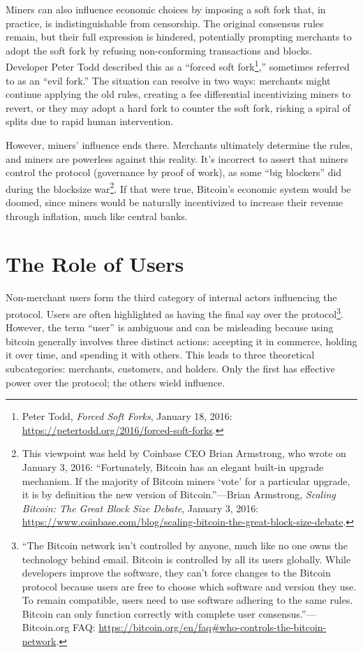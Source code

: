 \documentclass[
  a5paper,
  smalldemyvopaper,10pt,twoside,onecolumn,openright,extrafontsizes,hidelinks]{memoir}
\begin{document}
Miners can also influence economic choices by imposing a soft fork that,
in practice, is indistinguishable from censorship. The original
consensus rules remain, but their full expression is hindered,
potentially prompting merchants to adopt the soft fork by refusing
non-conforming transactions and blocks. Developer Peter Todd described
this as a ``forced soft fork\footnote{Peter Todd, \emph{Forced Soft
  Forks}, January 18, 2016:
  \url{https://petertodd.org/2016/forced-soft-forks}.},'' sometimes
referred to as an ``evil fork.'' The situation can resolve in two ways:
merchants might continue applying the old rules, creating a fee
differential incentivizing miners to revert, or they may adopt a hard
fork to counter the soft fork, risking a spiral of splits due to rapid
human intervention.

However, miners' influence ends there. Merchants ultimately determine
the rules, and miners are powerless against this reality. It's incorrect
to assert that miners control the protocol (governance by proof of
work), as some ``big blockers'' did during the blocksize war\footnote{This
  viewpoint was held by Coinbase CEO Brian Armstrong, who wrote on
  January 3, 2016: ``Fortunately, Bitcoin has an elegant built-in
  upgrade mechanism. If the majority of Bitcoin miners `vote' for a
  particular upgrade, it is by definition the new version of
  Bitcoin.''---Brian Armstrong, \emph{Scaling Bitcoin: The Great Block
  Size Debate}, January 3, 2016:
  \url{https://www.coinbase.com/blog/scaling-bitcoin-the-great-block-size-debate}.}.
If that were true, Bitcoin's economic system would be doomed, since
miners would be naturally incentivized to increase their revenue through
inflation, much like central banks.

\section*{The Role of Users}\label{the-role-of-users}


Non-merchant users form the third category of internal actors
influencing the protocol. Users are often highlighted as having the
final say over the protocol\footnote{``The Bitcoin network isn't
  controlled by anyone, much like no one owns the technology behind
  email. Bitcoin is controlled by all its users globally. While
  developers improve the software, they can't force changes to the
  Bitcoin protocol because users are free to choose which software and
  version they use. To remain compatible, users need to use software
  adhering to the same rules. Bitcoin can only function correctly with
  complete user consensus.''---Bitcoin.org FAQ:
  \url{https://bitcoin.org/en/faq\#who-controls-the-bitcoin-network}.}.
However, the term ``user'' is ambiguous and can be misleading because
using bitcoin generally involves three distinct actions: accepting it in
commerce, holding it over time, and spending it with others. This leads
to three theoretical subcategories: merchants, customers, and holders.
Only the first has effective power over the protocol; the others wield
influence.
\end{document}
